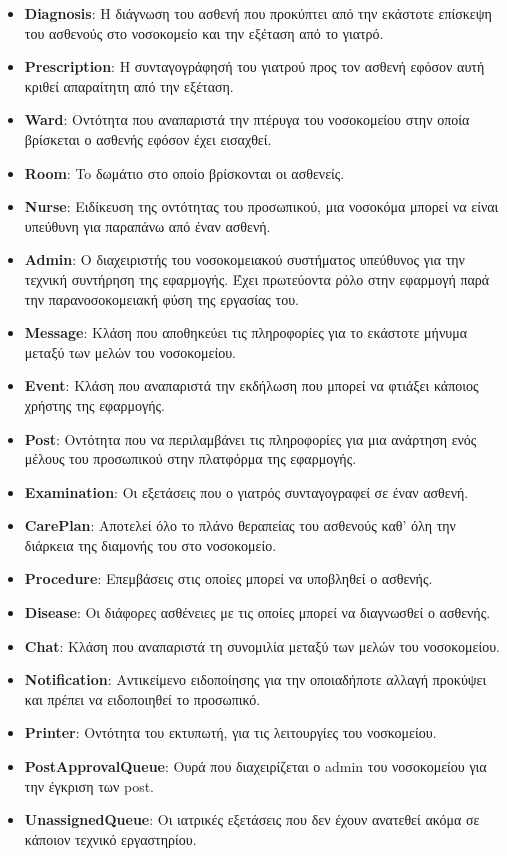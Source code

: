 \documentclass{article}
\begin{document}
\begin{itemize}
    \item \textbf{Diagnosis}: Η διάγνωση του ασθενή που προκύπτει από την εκάστοτε επίσκεψη του ασθενούς στο νοσοκομείο και την εξέταση από το γιατρό.
    \item \textbf{Prescription}: Η συνταγογράφησή του γιατρού προς τον ασθενή εφόσον αυτή κριθεί απαραίτητη από την εξέταση.
    \item \textbf{Ward}: Οντότητα που αναπαριστά την πτέρυγα του νοσοκομείου στην οποία βρίσκεται ο ασθενής εφόσον έχει εισαχθεί.
    \item \textbf{Room}: To δωμάτιο στο οποίο βρίσκονται οι ασθενείς.
    \item \textbf{Nurse}: Ειδίκευση της οντότητας του προσωπικού, μια νοσοκόμα μπορεί να είναι υπεύθυνη για παραπάνω από έναν ασθενή.
    \item\textbf{Admin}: Ο διαχειριστής του νοσοκομειακού συστήματος υπεύθυνος για την τεχνική συντήρηση της εφαρμογής. Έχει πρωτεύοντα ρόλο στην εφαρμογή παρά την παρανοσοκομειακή φύση της εργασίας του.
    \item\textbf{Message}: Κλάση που αποθηκεύει τις πληροφορίες για το εκάστοτε μήνυμα μεταξύ των μελών του νοσοκομείου.
    \item\textbf{Event}: Κλάση που αναπαριστά την εκδήλωση που μπορεί να φτιάξει κάποιος χρήστης της εφαρμογής.
    \item\textbf{Post}: Οντότητα που να περιλαμβάνει τις πληροφορίες για μια ανάρτηση ενός μέλους του προσωπικού στην πλατφόρμα της εφαρμογής.
    \item\textbf{Examination}: Οι εξετάσεις που ο γιατρός συνταγογραφεί σε έναν ασθενή.
    \item\textbf{CarePlan}: Αποτελεί όλο το πλάνο θεραπείας του ασθενούς καθ' όλη την διάρκεια της διαμονής του στο νοσοκομείο.
    \item\textbf{Procedure}: Επεμβάσεις στις οποίες μπορεί να υποβληθεί ο ασθενής.
    \item\textbf{Disease}: Οι διάφορες ασθένειες με τις οποίες μπορεί να διαγνωσθεί ο ασθενής.
    \item\textbf{Chat}: Κλάση που αναπαριστά τη συνομιλία μεταξύ των μελών του νοσοκομείου.
    \item\textbf{Notification}: Αντικείμενο ειδοποίησης για την οποιαδήποτε αλλαγή προκύψει και πρέπει να ειδοποιηθεί το προσωπικό.
    \item\textbf{Printer}: Οντότητα του εκτυπωτή, για τις λειτουργίες του νοσκομείου.
    \item\textbf{PostApprovalQueue}: Ουρά που διαχειρίζεται ο admin του νοσοκομείου για την έγκριση των post.
    \item\textbf{UnassignedQueue}: Οι ιατρικές εξετάσεις που δεν έχουν ανατεθεί ακόμα σε κάποιον τεχνικό εργαστηρίου.
\end{itemize}
\end{document}
